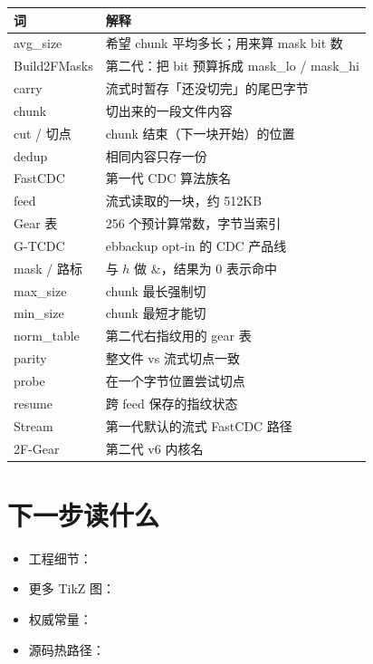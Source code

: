 \begin{longtable}{@{}p{3.2cm}p{10.8cm}@{}}
\toprule
\textbf{词} & \textbf{解释} \\
\midrule
\endhead
avg\_size & 希望 chunk 平均多长；用来算 mask bit 数 \\
Build2FMasks & 第二代：把 bit 预算拆成 mask\_lo / mask\_hi \\
carry & 流式时暂存「还没切完」的尾巴字节 \\
chunk & 切出来的一段文件内容 \\
cut / 切点 & chunk 结束（下一块开始）的位置 \\
dedup & 相同内容只存一份 \\
FastCDC & 第一代 CDC 算法族名 \\
feed & 流式读取的一块，约 512KB \\
Gear 表 & 256 个预计算常数，字节当索引 \\
G-TCDC & ebbackup opt-in 的 CDC 产品线 \\
mask / 路标 & 与 $h$ 做 \&，结果为 0 表示命中 \\
max\_size & chunk 最长强制切 \\
min\_size & chunk 最短才能切 \\
norm\_table & 第二代右指纹用的 gear 表 \\
parity & 整文件 vs 流式切点一致 \\
probe & 在一个字节位置尝试切点 \\
resume & 跨 feed 保存的指纹状态 \\
Stream & 第一代默认的流式 FastCDC 路径 \\
2F-Gear & 第二代 v6 内核名 \\
\bottomrule
\end{longtable}

\section{下一步读什么}

\begin{itemize}[nosep]
  \item 工程细节：
  \item 更多 TikZ 图：
  \item 权威常量：
  \item 源码热路径：
\end{itemize}
